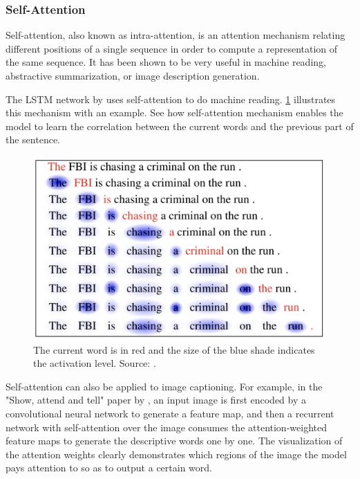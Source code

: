 \subsubsection{Self-Attention}

Self-attention, also known as intra-attention, is an attention mechanism relating different positions of a single sequence in order to compute a representation of the same sequence. It has been shown to be very useful in machine reading, abstractive summarization, or image description generation.

The LSTM network by \citet{Cheng2016} uses self-attention to do machine reading. \cref{fig:self-attention} illustrates this mechanism with an example. See how self-attention mechanism enables the model to learn the correlation between the current words and the previous part of the sentence.

\begin{figure}[hpt]
    \centering
    \includegraphics[scale=0.2]{images/ch3/self-attention.png}
    \caption{The current word is in red and the size of the blue shade indicates the activation level. Source: \citep{Cheng2016}.}
    \label{fig:self-attention}
\end{figure}

Self-attention can also be applied to image captioning. For example, in the "Show, attend and tell" paper by \citet{Xu2015}, an input image is first encoded by a convolutional neural network to generate a feature map, and then a recurrent network with self-attention over the image consumes the attention-weighted feature maps to generate the descriptive words one by one. The visualization of the attention weights clearly demonstrates which regions of the image the model pays attention to so as to output a certain word.

